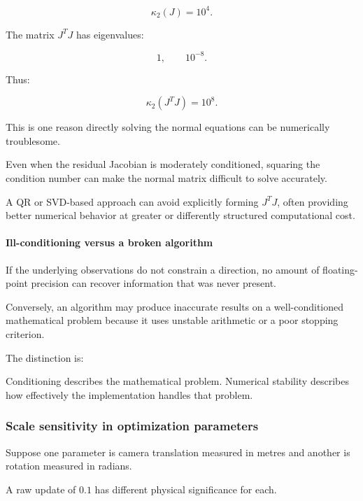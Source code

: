 \[
\kappa_2(J)=10^4.
\]

The matrix \(J^TJ\) has eigenvalues:

\[
1,\qquad10^{-8}.
\]

Thus:

\[
\boxed{\kappa_2(J^TJ)=10^8}.
\]

This is one reason directly solving the normal equations can be numerically troublesome.

Even when the residual Jacobian is moderately conditioned, squaring the condition number can make the normal matrix difficult to solve accurately.

A QR or SVD-based approach can avoid explicitly forming \(J^TJ\), often providing better numerical behavior at greater or differently structured computational cost.

\paragraph{Ill-conditioning versus a broken algorithm}\label{02-foundations-ii-ch027-ill-conditioning-versus-a-broken-algorithm}

\hypertarget{02-foundations-ii-ch027-ill-conditioning-versus-a-broken-algorithm}{}

If the underlying observations do not constrain a direction, no amount of floating-point precision can recover information that was never present.

Conversely, an algorithm may produce inaccurate results on a well-conditioned mathematical problem because it uses unstable arithmetic or a poor stopping criterion.

The distinction is:

Conditioning describes the mathematical problem. Numerical stability describes how effectively the implementation handles that problem.

\subsubsection{Scale sensitivity in optimization parameters}\label{02-foundations-ii-ch027-scale-sensitivity-in-optimization-parameters}

\hypertarget{02-foundations-ii-ch027-scale-sensitivity-in-optimization-parameters}{}

Suppose one parameter is camera translation measured in metres and another is rotation measured in radians.

A raw update of \(0.1\) has different physical significance for each.

